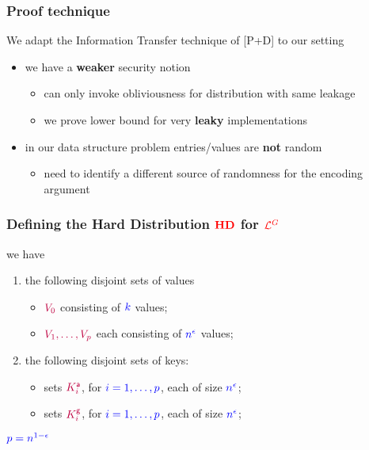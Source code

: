 \documentclass[]{beamer}
\newcommand{\calL}{\mathcal{L}}
\newcommand{\lQ}{\calL^G}
\newcommand{\aaa}{\mathsf{a}}
\begin{document}
\begin{frame}
\frametitle{Proof technique}

We adapt the {\color{blue} Information Transfer} technique of [P+D] to our setting
\vskip 1.5cm
\begin{itemize}
\item we have a {\color{red}\bf weaker} security notion
    \begin{itemize}
        \item {\color{green} can only invoke obliviousness for distribution with same leakage}
        \item {\color{purple} we prove lower bound for very {\bf leaky} implementations}
    \end{itemize}

\vskip 1cm

\item in our data structure problem entries/values are {\color{red}\bf not} random
    \begin{itemize}
        \item {\color{green} need to identify a different source of randomness for the encoding argument}
    \end{itemize}
    
\end{itemize}
\end{frame}

\begin{frame}
\frametitle{Defining the Hard Distribution $\color{red}\mathbf{HD}$ for $\color{red}\lQ$}
we have
\begin{enumerate}
\item the following {\color{red} disjoint} sets of {\color{blue} values}
\begin{itemize}
    \item $\color{purple} V_0$ consisting of $\color{blue} k$ values;
    \item $\color{purple} V_1,\ldots,V_p$ each consisting of $\color{blue} n^\epsilon$ values;
\end{itemize}
\vskip 1cm
\item the following {\color{red} disjoint} sets of {\color{blue} keys}:
\begin{itemize}
    \item sets $\color{purple} K_i^\aaa$,        for $\color{blue} i=1,\ldots,p$, each of size $\color{blue} n^\epsilon$;
    \item sets $\color{purple} K_i^\mathsf{g}$,  for $\color{blue} i=1,\ldots,p$, each of size $\color{blue} n^\epsilon$;
\end{itemize}
\end{enumerate}

\pause
\vfill
\hfill$\color{blue} p=n^{1-\epsilon}$
\end{frame}
\end{document}
